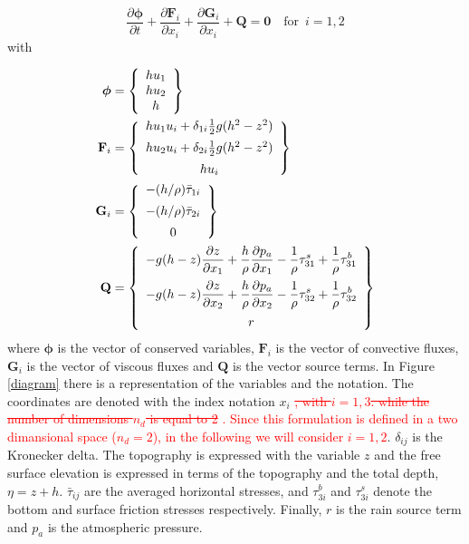 \documentclass[a4paper,12pt]{elsarticle}
\newcommand{\Miguel}[1]{\textcolor{red}{#1}}
\newcommand{\pder}[2]{\frac{\partial#1}{\partial#2}}
\begin{document}
\begin{equation} \label{general_sw}
\pder{\bm{\phi}}{t} + \pder{\mathbf{F}_i}{x_i} + \pder{\mathbf{G}_i}{x_i} + \mathbf{Q} = \mathbf{0} \quad \text{for} \enspace i=1,2
\end{equation}
with

\begin{subequations}\label{variables_and_fluxes}
\allowdisplaybreaks
\begin{align}
\bm{\phi} &= \left\{
    \begin{array}{c}
        hu_1 \\
        hu_2 \\
        h
    \end{array}\right\} \\
\mathbf{F}_i &= \left\{
    \begin{array}{c}
        hu_1u_i + \delta_{1i}\frac{1}{2}g(h^2 - z^2) \\ [5pt]
        hu_2u_i + \delta_{2i}\frac{1}{2}g(h^2 - z^2) \\ [5pt]
        hu_i
    \end{array}\right\} \\
\mathbf{G}_i &= \left\{
    \begin{array}{c}
        -(h/\rho) \bar{\tau}_{1i} \\ [5pt]
        -(h/\rho) \bar{\tau}_{2i} \\ [5pt]
        0
    \end{array}\right\} \\
\mathbf{Q} &= \left\{
    \begin{array}{c}
        \displaystyle -g(h-z)\pder{z}{x_1} + \frac{h}{\rho}\pder{p_a}{x_1}
        - \frac{1}{\rho}\tau^s_{31} + \frac{1}{\rho}\tau^b_{31} \\ [10pt]
        \displaystyle -g(h-z)\pder{z}{x_2} + \frac{h}{\rho}\pder{p_a}{x_2}
        - \frac{1}{\rho}\tau^s_{32} + \frac{1}{\rho}\tau^b_{32} \\ [10pt]
        r
    \end{array}\right\}
\end{align}
\end{subequations}
where $\bm{\phi}$ is the vector of conserved variables, $\mathbf{F}_i$ is the vector of convective fluxes, $\mathbf{G}_i$ is the vector of viscous fluxes and $\mathbf{Q}$ is the vector source terms. In Figure \ref{diagram} there is a representation of the variables and the notation. The coordinates are denoted with the index notation $x_i$ \Miguel{\sout{, with $i=1,3$. while the number of dimensions $n_d$ is equal to 2}} \Miguel{. Since this formulation is defined in a two dimansional space ($n_d=2$), in the following we will consider $i=1,2$}. $\delta_{ij}$ is the Kronecker delta. The topography is expressed with the variable $z$ and the free surface elevation is expressed in terms of the topography and the total depth, $\eta = z + h$. $\bar{\tau}_{ij}$ are the averaged horizontal stresses, and $\tau^b_{3i}$ and $\tau^s_{3i}$ denote the bottom and surface friction stresses respectively. Finally, $r$ is the rain source term and $p_a$ is the atmospheric pressure.
\end{document}
